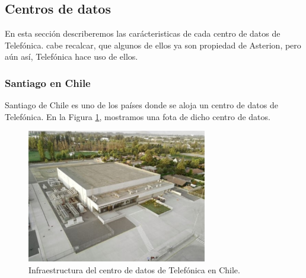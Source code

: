 \documentclass{article}
\begin{document}
\subsection{Centros de datos}

En esta sección describeremos las carácteristicas de cada centro de datos de Telefónica. cabe recalcar, que algunos de ellos ya son propiedad de Asterion, pero aún así, Telefónica hace uso de ellos.

\subsubsection{Santiago en Chile}

Santiago de Chile es uno de los países donde se aloja un centro de datos de Telefónica. En la Figura \ref{img:chile}, mostramos una fota de dicho centro de datos. 

\begin{figure}[H]
	\centering
	\includegraphics[width=0.7\textwidth]{img/datacenter/chile}	
	\caption{Infraestructura del centro de datos de Telefónica en Chile.}
	\label{img:chile}
\end{figure}
\end{document}
